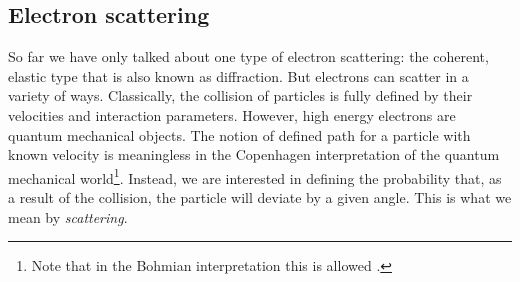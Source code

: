 \subsection{Electron scattering}
\label{sec:scatter}

So far we have only talked about one type of electron scattering: the coherent, elastic type that is also known as diffraction. But electrons can scatter in a variety of ways.  Classically, the collision of particles is fully defined by their velocities and interaction parameters. However, high energy electrons are quantum mechanical objects. The notion of defined path for a particle with known velocity is meaningless in the Copenhagen interpretation of the quantum mechanical world\footnote{Note that in the Bohmian interpretation this is allowed \cite{Cheng18}.}. Instead, we are interested in defining the probability that, as a result of the collision, the particle will deviate by a given angle. This is what we mean by \textit{scattering}.

